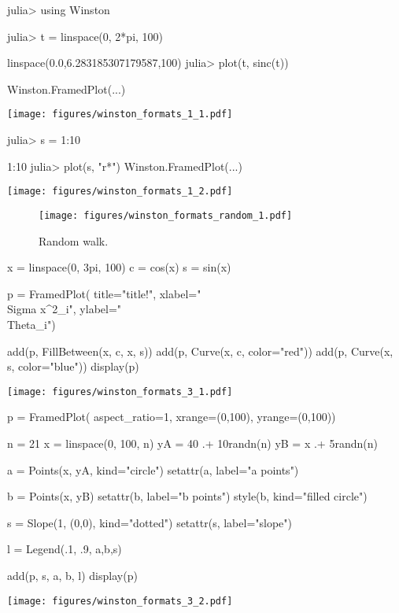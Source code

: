 
\begin{juliaterm}
julia> using Winston

julia> t = linspace(0, 2*pi, 100)

linspace(0.0,6.283185307179587,100)
julia> plot(t, sinc(t))

Winston.FramedPlot(...)
\end{juliaterm}
\texttt{[image: figures/winston\_formats\_1\_1.pdf]}

\begin{juliaterm}
julia> s = 1:10

1:10
julia> plot(s, "r*")
Winston.FramedPlot(...)
\end{juliaterm}
\texttt{[image: figures/winston\_formats\_1\_2.pdf]}





\begin{figure}[htpb]
\center
\texttt{[image: figures/winston\_formats\_random\_1.pdf]}
\caption{Random walk.}
\label{fig:random}
\end{figure}




\begin{juliacode}
x = linspace(0, 3pi, 100)
c = cos(x)
s = sin(x)

p = FramedPlot(
         title="title!",
         xlabel="\\Sigma x^2_i",
         ylabel="\\Theta_i")

add(p, FillBetween(x, c, x, s))
add(p, Curve(x, c, color="red"))
add(p, Curve(x, s, color="blue"))
display(p)

\end{juliacode}
\texttt{[image: figures/winston\_formats\_3\_1.pdf]}

\begin{juliacode}

p = FramedPlot(
     aspect_ratio=1,
     xrange=(0,100),
     yrange=(0,100))

n = 21
x = linspace(0, 100, n)
yA = 40 .+ 10randn(n)
yB = x .+ 5randn(n)

a = Points(x, yA, kind="circle")
setattr(a, label="a points")

b = Points(x, yB)
setattr(b, label="b points")
style(b, kind="filled circle")

s = Slope(1, (0,0), kind="dotted")
setattr(s, label="slope")

l = Legend(.1, .9, {a,b,s})

add(p, s, a, b, l)
display(p)
\end{juliacode}
\texttt{[image: figures/winston\_formats\_3\_2.pdf]}
